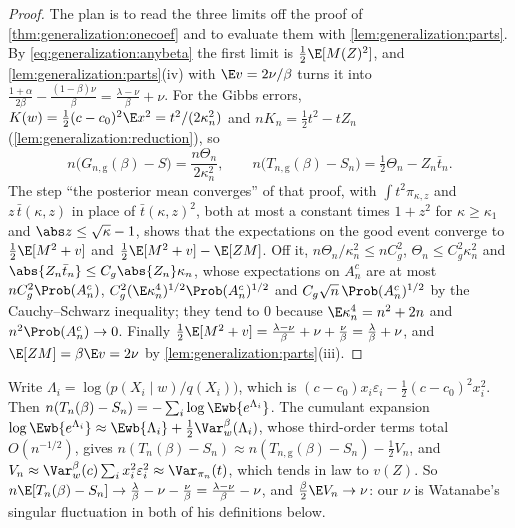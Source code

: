 \begin{refsection}
\begin{proof}
The plan is to read the three limits off the proof of \cref{thm:generalization:onecoef} and to evaluate them with \cref{lem:generalization:parts}. By \eqref{eq:generalization:anybeta} the first limit is $\frac12\E[M(Z)^2]$, and \cref{lem:generalization:parts}(iv) with $\E v=2\nu/\beta$ turns it into $\frac{1+\alpha}{2\beta}-\frac{(1-\beta)\nu}\beta=\frac{\lambda-\nu}\beta+\nu$. For the Gibbs errors, $K(w)=\frac12(c-c_0)^2\E x^2=t^2/(2\kappa_n^2)$ and $nK_n=\frac12t^2-tZ_n$ (\cref{lem:generalization:reduction}), so
\[
n\bigl(G_{n,\mathrm g}(\beta)-S\bigr)=\frac{n\Theta_n}{2\kappa_n^2},\qquad n\bigl(T_{n,\mathrm g}(\beta)-S_n\bigr)=\tfrac12\Theta_n-Z_n\bar t_n .
\]
The step ``the posterior mean converges'' of that proof, with $\int t^2\pi_{\kappa,z}$ and $z\,\bar t(\kappa,z)$ in place of $\bar t(\kappa,z)^2$, both at most a constant times $1+z^2$ for $\kappa\ge\kappa_1$ and $\abs z\le\sqrt\kappa-1$, shows that the expectations on the good event converge to $\frac12\E[M^2+v]$ and $\frac12\E[M^2+v]-\E[ZM]$. Off it, $n\Theta_n/\kappa_n^2\le nC_g^2$, $\Theta_n\le C_g^2\kappa_n^2$ and $\abs{Z_n\bar t_n}\le C_g\abs{Z_n}\kappa_n$, whose expectations on $A_n^c$ are at most $nC_g^2\Prob(A_n^c)$, $C_g^2(\E\kappa_n^4)^{1/2}\Prob(A_n^c)^{1/2}$ and $C_g\sqrt n\,\Prob(A_n^c)^{1/2}$ by the Cauchy--Schwarz inequality; they tend to $0$ because $\E\kappa_n^4=n^2+2n$ and $n^2\Prob(A_n^c)\to0$. Finally $\frac12\E[M^2+v]=\frac{\lambda-\nu}\beta+\nu+\frac\nu\beta=\frac\lambda\beta+\nu$, and $\E[ZM]=\beta\E v=2\nu$ by \cref{lem:generalization:parts}(iii).
\end{proof}

\begin{heuristic}
Write $\Lambda_i=\log\bigl(p(X_i\mid w)/q(X_i)\bigr)$, which is $(c-c_0)x_i\varepsilon_i-\frac12(c-c_0)^2x_i^2$. Then $n(T_n(\beta)-S_n)=-\sum_i\log\Ewb{e^{\Lambda_i}}$. The cumulant expansion $\log\Ewb{e^{\Lambda_i}}\approx\Ewb{\Lambda_i}+\frac12\Var^\beta_w(\Lambda_i)$, whose third-order terms total $O(n^{-1/2})$, gives $n(T_n(\beta)-S_n)\approx n(T_{n,\mathrm g}(\beta)-S_n)-\frac12V_n$, and $V_n\approx\Var^\beta_w(c)\sum_ix_i^2\varepsilon_i^2\approx\Var_{\pi_n}(t)$, which tends in law to $v(Z)$. So $n\E[T_n(\beta)-S_n]\to\frac\lambda\beta-\nu-\frac\nu\beta=\frac{\lambda-\nu}\beta-\nu$, and $\frac\beta2\E V_n\to\nu$: our $\nu$ is Watanabe's singular fluctuation in both of his definitions below.
\end{heuristic}


\end{refsection}
